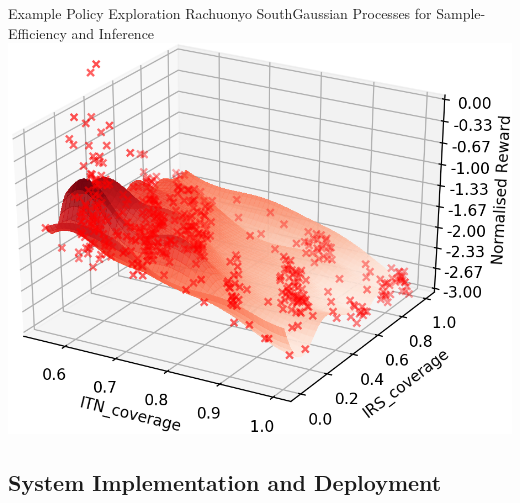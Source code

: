 \documentclass[10pt,usenames,dvipsnames]{beamer}
\begin{document}
\begin{frame}{Example Policy Exploration Rachuonyo South}{Gaussian Processes for Sample-Efficiency and Inference}
\centering
\includegraphics[width=1\textheight]{images/Batch_7.png}
\end{frame}



\subsection{System Implementation and Deployment}
\end{document}
